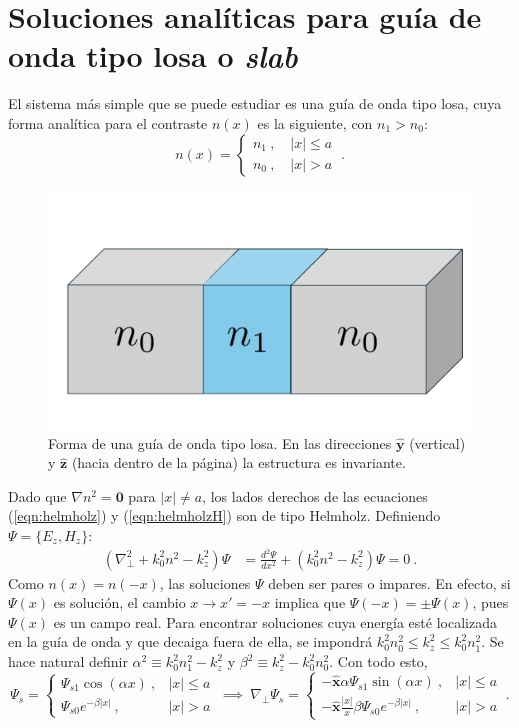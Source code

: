 \section{Soluciones analíticas para guía de onda tipo losa o \textit{slab}}
El sistema más simple que se puede estudiar es una guía de onda tipo losa, cuya forma analítica para el contraste $n(x)$ es la siguiente, con $n_1 > n_0$:
\begin{equation*}
	n(x) = \left\{\begin{matrix}
	n_1 \ , \quad |x| \le a
	\\
	n_0 \ , \quad |x| > a
 	\end{matrix}\right. \ .
\end{equation*}
\begin{figure}[H]
	\centering
	\includegraphics[width=0.6\linewidth]{media/slab.pdf}
	\caption[Forma de una guía de onda tipo losa.]{Forma de una guía de onda tipo losa. En las direcciones $\mathbf{\hat{y}}$ (vertical) y $\mathbf{\hat{z}}$ (hacia dentro de la página) la estructura es invariante.}
\end{figure}
Dado que $\nabla n^2 = \textbf{0}$ para $|x| \neq a$, los lados derechos de las ecuaciones (\ref{eqn:helmholz}) y (\ref{eqn:helmholzH}) son de tipo Helmholz. Definiendo $\Psi = \{E_z, H_z\} $:
\begin{align*}
	(\nabla_\perp^2  + k_0^2n^2 - k_z^2) \Psi  &=  \frac{d^2\Psi}{dx^2} + (k_0^2n^2 - k_z^2) \Psi  = 0 \ .
\end{align*}
Como $n(x)=n(-x)$, las soluciones $\Psi$ deben ser pares o impares. En efecto, si $\Psi(x)$ es solución, el cambio $x\to x'=-x$ implica que $\Psi(-x)=\pm \Psi(x)$, pues $\Psi(x)$ es un campo real.
Para encontrar soluciones cuya energía esté localizada en la guía de onda y que decaiga fuera de ella, se impondrá $k_0^2n_0^2 \le k_z^2 \le k_0^2n_1^2$. Se hace natural definir $\alpha^2\equiv k_0^2n_1^2-k_z^2$ y $\beta^2\equiv k_z^2 - k_0^2n_0^2$. Con todo esto, 
\begin{equation*}
	\Psi_s = \left\{\begin{matrix}
	\Psi_{s1}\cos(\alpha x) \ , & |x|\le a
	\\
	\Psi_{s0}e^{-\beta|x|} \ , & |x|>a
	\end{matrix}\right.
	\
	\implies 	
	\	
	\nabla_\perp \Psi_s = \left\{\begin{matrix}
	-\hat{\textbf{x}}\alpha\Psi_{s1}\sin(\alpha x) \ , & |x|\le a
	\\
	-\hat{\textbf{x}}\frac{|x|}{x}\beta\Psi_{s0}e^{-\beta|x|} \ , & |x|>a
	\end{matrix}\right.
	\
	.
\end{equation*}
